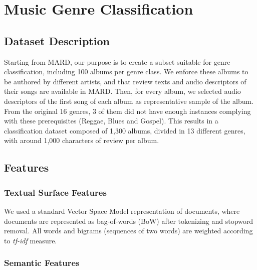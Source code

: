 \section{Music Genre Classification}\label{sec:classification}


\subsection{Dataset Description}

Starting from MARD, our purpose is to create a subset suitable for genre classification, including 100 albums per genre class. We enforce these albums to be authored by different artists, and that review texts and audio descriptors of their songs are available in MARD. Then, for every album, we selected audio descriptors of the first song of each album as representative sample of the album. From the original 16 genres, 3 of them did not have enough instances complying with these prerequisites (Reggae, Blues and Gospel). This results in a classification dataset composed of 1,300 albums, divided in 13 different genres, with around 1,000 characters of review per album.

\subsection{Features}
\label{sec:features}
\subsubsection{Textual Surface Features}
We used a standard Vector Space Model representation of documents, where documents are represented as bag-of-words (BoW) after tokenizing and stopword removal. All words and bigrams (sequences of two words) are weighted according to \textit{tf-idf} measure. 

\subsubsection{Semantic Features}

